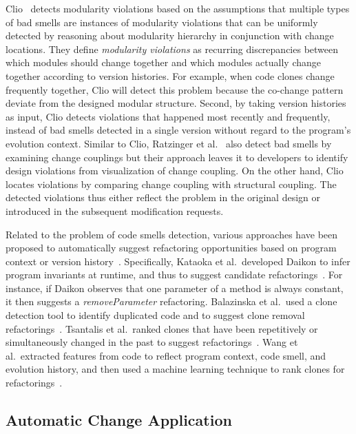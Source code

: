 \documentclass[runningheads,a4paper]{llncs}
\begin{document}
Clio~\cite{Wong2011:cleo} detects modularity violations based on the assumptions that multiple types of bad smells are instances of modularity violations that can be uniformly detected by reasoning about modularity hierarchy in conjunction with change locations.  They define {\em modularity violations} as recurring discrepancies between which modules should change together and which modules actually change together according to version histories. For example, when code clones change frequently together, Clio will detect this problem because the co-change pattern deviate from the designed modular structure. Second, by taking version histories as input, Clio detects violations that happened most recently and frequently, instead of bad smells detected in a single version without regard to the program's evolution context. Similar to Clio, Ratzinger et al.~\cite{ratzinger:msr05} also detect bad smells by examining change couplings but their approach leaves it to developers to identify design violations from visualization of change coupling. On the other hand, Clio locates violations by comparing change coupling with structural coupling. The detected violations thus either reflect the problem in the original design or introduced in the subsequent modification requests.

Related to the problem of code smells detection, various approaches have been proposed to automatically suggest refactoring opportunities based on program context or version history~\cite{Balazinska2000:ACA,Kataoka2001:ASP,Higo2008:metricrefactoring,Tsantalis2011:rankRefactoring,Wang2014:recommendClones,Meng2015:ARO}. Specifically, Kataoka et al.~developed Daikon to infer program invariants at runtime, and thus to suggest candidate refactorings~\cite{Kataoka2001:ASP}. For instance, if Daikon observes that one parameter of a method is always constant, it then suggests a \emph{removeParameter} refactoring. Balazinska et al.~used a clone detection tool to identify duplicated code and to suggest clone removal refactorings~\cite{Balazinska2000:ACA}. Tsantalis et al.~ranked clones that have been repetitively or simultaneously changed in the past to suggest refactorings~\cite{Tsantalis2011:rankRefactoring}. Wang et al.~extracted features from code to reflect program context, code smell, and evolution history, and then used a machine learning technique to rank clones for refactorings~\cite{Wang2014:recommendClones}.


\subsection{Automatic Change Application}
\label{sec:automatic}
\end{document}
